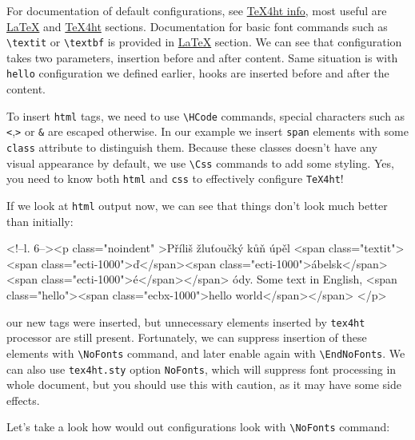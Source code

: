 For documentation of default configurations, see
\href{http://michal-h21.github.io/src4ht/tex4ht-info.html}{TeX4ht info},
most useful are
\href{http://michal-h21.github.io/src4ht/tex4ht-infose2.html}{LaTeX} and
\href{http://michal-h21.github.io/src4ht/tex4ht-infose1.html}{TeX4ht}
sections. Documentation for basic font commands such as
\texttt{\textbackslash{}textit} or \texttt{\textbackslash{}textbf} is
provided in
\href{http://michal-h21.github.io/src4ht/tex4ht-infose2.html}{LaTeX}
section. We can see that configuration takes two parameters, insertion
before and after content. Same situation is with \texttt{hello}
configuration we defined earlier, hooks are inserted before and after
the content.

To insert \texttt{html} tags, we need to use
\texttt{\textbackslash{}HCode} commands, special characters such as
\texttt{\textless{}},\texttt{\textgreater{}} or \texttt{\&} are escaped
otherwise. In our example we insert \texttt{span} elements with some
\texttt{class} attribute to distinguish them. Because these classes
doesn't have any visual appearance by default, we use
\texttt{\textbackslash{}Css} commands to add some styling. Yes, you need
to know both \texttt{html} and \texttt{css} to effectively configure
\texttt{TeX4ht}!

If we look at \texttt{html} output now, we can see that things don't
look much better than initially:

\begin{htmlsource}
<!--l. 6--><p class="noindent" >Příliš žluťoučký kůň úpěl <span class="textit"><span 
class="ecti-1000">ď</span><span 
class="ecti-1000">ábelsk</span><span 
class="ecti-1000">é</span></span> ódy. Some text in English, <span class="hello"><span 
class="ecbx-1000">hello world</span></span>
</p> 
\end{htmlsource}

our new tags were inserted, but unnecessary elements inserted by
\texttt{tex4ht} processor are still present. Fortunately, we can
suppress insertion of these elements with
\texttt{\textbackslash{}NoFonts} command, and later enable again with
\texttt{\textbackslash{}EndNoFonts}. We can also use \texttt{tex4ht.sty}
option \texttt{NoFonts}, which will suppress font processing in whole
document, but you should use this with caution, as it may have some side
effects.

Let's take a look how would out configurations look with
\texttt{\textbackslash{}NoFonts} command:

\begin{texsource}
{\EndNoFonts{}}
{\EndNoFonts{}}

\EndPreamble
\end{texsource}

